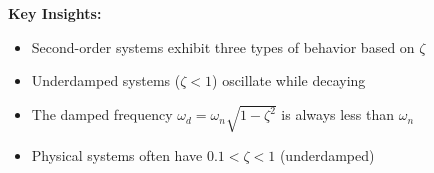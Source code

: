 \documentclass[11pt,a4paper]{article}
\begin{document}
\textbf{Key Insights:}
\begin{itemize}
  \item Second-order systems exhibit three types of behavior based on $\zeta$
  \item Underdamped systems ($\zeta < 1$) oscillate while decaying
  \item The damped frequency $\omega_d = \omega_n\sqrt{1-\zeta^2}$ is always less than $\omega_n$
  \item Physical systems often have $0.1 < \zeta < 1$ (underdamped)
\end{itemize}
\end{document}
